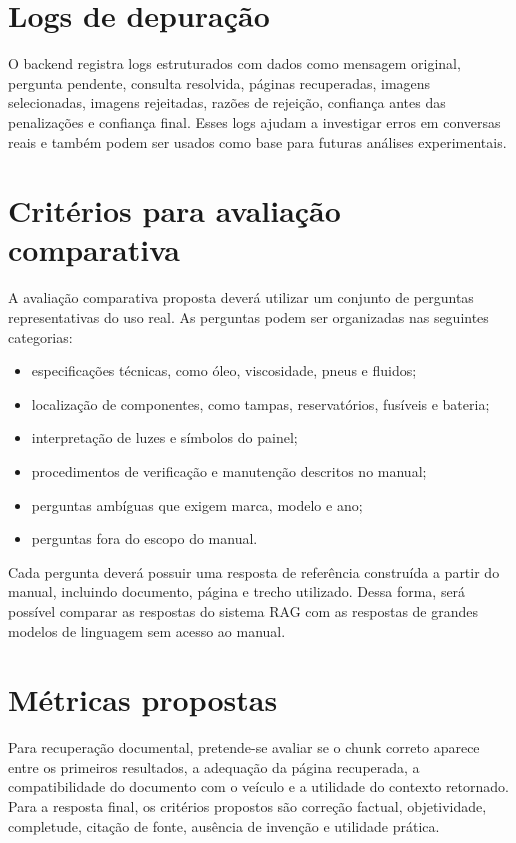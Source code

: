 \section{Logs de depuração}

O backend registra logs estruturados com dados como mensagem original, pergunta pendente, consulta resolvida, páginas recuperadas, imagens selecionadas, imagens rejeitadas, razões de rejeição, confiança antes das penalizações e confiança final. Esses logs ajudam a investigar erros em conversas reais e também podem ser usados como base para futuras análises experimentais.

\section{Critérios para avaliação comparativa}

A avaliação comparativa proposta deverá utilizar um conjunto de perguntas representativas do uso real. As perguntas podem ser organizadas nas seguintes categorias:

\begin{itemize}
  \item especificações técnicas, como óleo, viscosidade, pneus e fluidos;
  \item localização de componentes, como tampas, reservatórios, fusíveis e bateria;
  \item interpretação de luzes e símbolos do painel;
  \item procedimentos de verificação e manutenção descritos no manual;
  \item perguntas ambíguas que exigem marca, modelo e ano;
  \item perguntas fora do escopo do manual.
\end{itemize}

Cada pergunta deverá possuir uma resposta de referência construída a partir do manual, incluindo documento, página e trecho utilizado. Dessa forma, será possível comparar as respostas do sistema RAG com as respostas de grandes modelos de linguagem sem acesso ao manual.

\section{Métricas propostas}

Para recuperação documental, pretende-se avaliar se o chunk correto aparece entre os primeiros resultados, a adequação da página recuperada, a compatibilidade do documento com o veículo e a utilidade do contexto retornado. Para a resposta final, os critérios propostos são correção factual, objetividade, completude, citação de fonte, ausência de invenção e utilidade prática.


